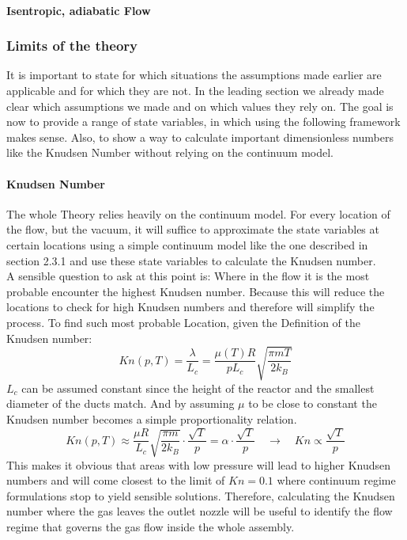 \paragraph{Isentropic, adiabatic Flow}

\newpage

\subsubsection{Limits of the theory}
It is important to state for which situations the assumptions made earlier are applicable and for which they are not. In the leading section we already made clear which assumptions we made  and on which values they rely on. The goal is now to provide a range of state variables, in which using the following framework makes sense. Also, to show a way to calculate important dimensionless numbers like the Knudsen Number without relying on the continuum model.
\paragraph{Knudsen Number}
The whole Theory relies heavily on the continuum model. For every location of the flow, but the vacuum, it will suffice to approximate the state variables at certain locations using a simple continuum model like the one described in section 2.3.1  and use these state variables to calculate the Knudsen number.\\
A sensible question to ask at this point is: Where in the flow it is the most probable encounter the highest Knudsen number. Because this will reduce the locations to check for high Knudsen numbers and therefore will simplify the process. To find such most probable Location, given the Definition of the Knudsen number:
$$
Kn(p,T) = \frac{\lambda}{L_c} = \frac{\mu(T)R}{pL_c}\sqrt{\frac{\pi m T}{2k_B}}
$$
$L_c$ can be assumed constant since the height of the reactor and the smallest diameter of the ducts match. And by assuming $\mu$ to be close to constant the Knudsen number becomes a simple proportionality relation.
$$
Kn(p,T)\approx\frac{\mu R}{L_c}\sqrt{\frac{\pi m}{2k_B}}\cdot\frac{\sqrt{T}}{p}=\alpha\cdot\frac{\sqrt{T}}{p}\quad\rightarrow\quad Kn\propto \frac{\sqrt{T}}{p}
$$
This makes it obvious that areas with low pressure will lead to higher Knudsen numbers and will come closest to the limit of $Kn=0.1$ where continuum regime formulations stop to yield sensible solutions. Therefore, calculating the Knudsen number where the gas leaves the outlet nozzle will be useful to identify the flow regime that governs the gas flow inside the whole assembly.  

